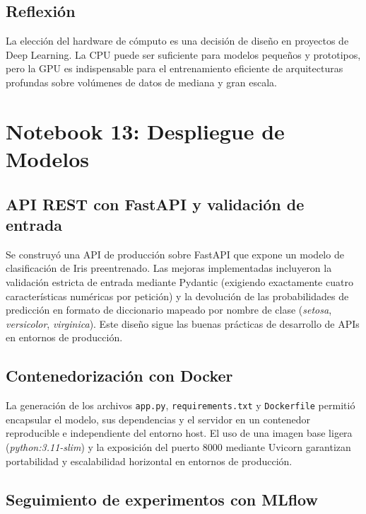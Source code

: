 \documentclass[12pt, a4paper]{article}
\begin{document}
\subsection{Reflexión}

La elección del hardware de cómputo es una decisión de diseño en proyectos de Deep Learning. La CPU puede ser suficiente para modelos pequeños y prototipos, pero la GPU es indispensable para el entrenamiento eficiente de arquitecturas profundas sobre volúmenes de datos de mediana y gran escala.

\section{Notebook 13: Despliegue de Modelos}

\subsection{API REST con FastAPI y validación de entrada}

Se construyó una API de producción sobre FastAPI que expone un modelo de clasificación de Iris preentrenado. Las mejoras implementadas incluyeron la validación estricta de entrada mediante Pydantic (exigiendo exactamente cuatro características numéricas por petición) y la devolución de las probabilidades de predicción en formato de diccionario mapeado por nombre de clase (\textit{setosa}, \textit{versicolor}, \textit{virginica}). Este diseño sigue las buenas prácticas de desarrollo de APIs en entornos de producción.

\subsection{Contenedorización con Docker}

La generación de los archivos \texttt{app.py}, \texttt{requirements.txt} y \texttt{Dockerfile} permitió encapsular el modelo, sus dependencias y el servidor en un contenedor reproducible e independiente del entorno host. El uso de una imagen base ligera (\textit{python:3.11-slim}) y la exposición del puerto 8000 mediante Uvicorn garantizan portabilidad y escalabilidad horizontal en entornos de producción.

\subsection{Seguimiento de experimentos con MLflow}
\end{document}
